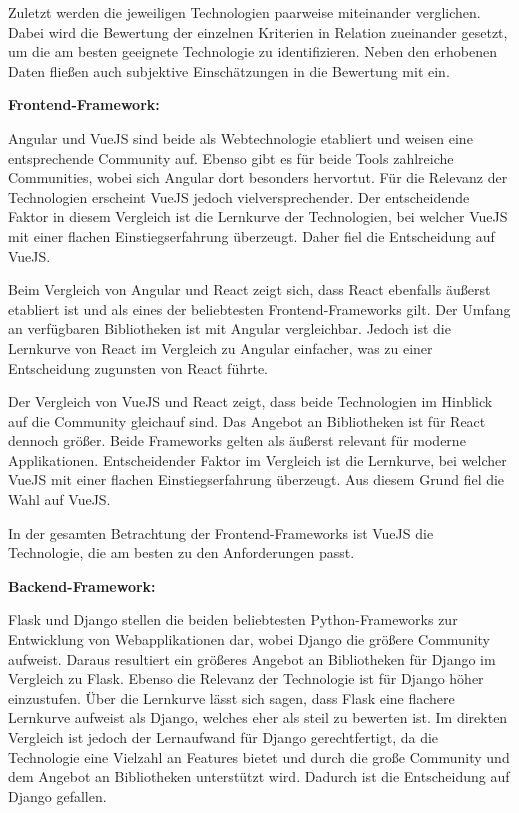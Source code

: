Zuletzt werden die jeweiligen Technologien paarweise miteinander verglichen.
Dabei wird die Bewertung der einzelnen Kriterien in Relation zueinander gesetzt, um die am besten geeignete Technologie zu identifizieren.
Neben den erhobenen Daten fließen auch subjektive Einschätzungen in die Bewertung mit ein.

\textbf{Frontend-Framework:}

Angular und VueJS sind beide als Webtechnologie etabliert und weisen eine entsprechende Community auf.
Ebenso gibt es für beide Tools zahlreiche Communities, wobei sich Angular dort besonders hervortut.
Für die Relevanz der Technologien erscheint VueJS jedoch vielversprechender.
Der entscheidende Faktor in diesem Vergleich ist die Lernkurve der Technologien, bei welcher VueJS mit einer flachen Einstiegserfahrung überzeugt.
Daher fiel die Entscheidung auf VueJS.

Beim Vergleich von Angular und React zeigt sich, dass React ebenfalls äußerst etabliert ist und als eines der beliebtesten Frontend-Frameworks gilt.
Der Umfang an verfügbaren Bibliotheken ist mit Angular vergleichbar.
Jedoch ist die Lernkurve von React im Vergleich zu Angular einfacher, was zu einer Entscheidung zugunsten von React führte.

Der Vergleich von VueJS und React zeigt, dass beide Technologien im Hinblick auf die Community gleichauf sind.
Das Angebot an Bibliotheken ist für React dennoch größer.
Beide Frameworks gelten als äußerst relevant für moderne Applikationen.
Entscheidender Faktor im Vergleich ist die Lernkurve, bei welcher VueJS mit einer flachen Einstiegserfahrung überzeugt.
Aus diesem Grund fiel die Wahl auf VueJS.

In der gesamten Betrachtung der Frontend-Frameworks ist VueJS die Technologie, die am besten zu den Anforderungen passt.

\textbf{Backend-Framework:}

Flask und Django stellen die beiden beliebtesten Python-Frameworks zur Entwicklung von Webapplikationen dar, wobei Django die größere Community aufweist.
Daraus resultiert ein größeres Angebot an Bibliotheken für Django im Vergleich zu Flask.
Ebenso die Relevanz der Technologie ist für Django höher einzustufen.
Über die Lernkurve lässt sich sagen, dass Flask eine flachere Lernkurve aufweist als Django, welches eher als steil zu bewerten ist.
Im direkten Vergleich ist jedoch der Lernaufwand für Django gerechtfertigt, da die Technologie eine Vielzahl an Features bietet und durch die große Community und dem Angebot an Bibliotheken unterstützt wird.
Dadurch ist die Entscheidung auf Django gefallen.

